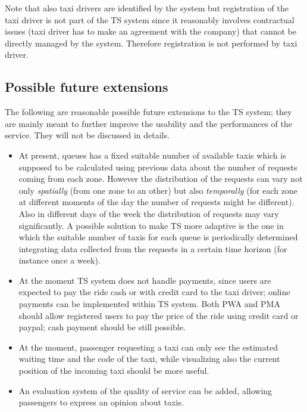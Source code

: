 Note that also taxi drivers are identified by the system but registration
of the taxi driver is not part of the TS system since it reasonably
involves contractual issues (taxi driver has to make an agreement
with the company) that cannot be directly managed by the system. Therefore
registration is not performed by taxi driver.


\subsection{Possible future extensions}

The following are reasonable possible future extensions to the TS
system; they are mainly meant to further improve the usability and
the performances of the service. They will not be discussed in details.
\begin{itemize}
\item At present, queues has a fixed suitable number of available taxis
which is supposed to be calculated using previous data about the number
of requests coming from each zone. However the distribution of the
requests can vary not only \emph{spatially} (from one zone to an other)
but also \emph{temporally} (for each zone at different moments of
the day the number of requests might be different). Also in different
days of the week the distribution of requests may vary significantly.
A possible solution to make TS more adaptive is the one in which the
suitable number of taxis for each queue is periodically determined
integrating data collected from the requests in a certain time horizon
(for instance once a week).
\item At the moment TS system does not handle payments, since users are
expected to pay the ride cash or with credit card to the taxi driver;
online payments can be implemented within TS system. Both PWA and
PMA should allow registered users to pay the price of the ride using
credit card or paypal; cash payment should be still possible.
\item At the moment, passenger requesting a taxi can only see the estimated
waiting time and the code of the taxi, while visualizing also the
current position of the incoming taxi should be more useful.
\item An evaluation system of the quality of service can be added, allowing
passengers to express an opinion about taxis.\end{itemize}

